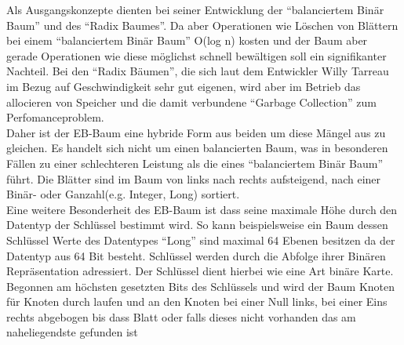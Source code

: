 \documentclass[a4paper,11pt,oneside,%
headsepline,												%
footsepline,												%
bibtotocnumbered									%
]{scrreprt}
\begin{document}
Als Ausgangskonzepte dienten bei seiner Entwicklung der \enquote{balanciertem Binär Baum} und des \enquote{Radix Baumes}. Da aber Operationen wie Löschen von Blättern bei einem \enquote{balanciertem Binär Baum} O(log n) kosten und der Baum aber gerade Operationen wie diese möglichst schnell bewältigen soll ein signifikanter Nachteil. Bei den \enquote{Radix Bäumen}, die sich laut dem Entwickler Willy Tarreau\autocite[Absatz Introduction]{Tarreau} im Bezug auf Geschwindigkeit sehr gut eigenen, wird aber im Betrieb das allocieren von Speicher und die damit verbundene \enquote{Garbage Collection} zum Perfomanceproblem.\\

Daher ist der \ac{EB-Baum} eine hybride Form aus beiden um diese Mängel aus zu gleichen. Es handelt sich nicht um einen balancierten Baum, was in besonderen Fällen zu einer schlechteren Leistung als die eines \enquote{balanciertem Binär Baum} führt. Die Blätter sind im Baum von links nach rechts aufsteigend, nach einer Binär- oder Ganzahl(e.g. Integer, Long) sortiert.\\

Eine weitere Besonderheit des \ac{EB-Baum} ist dass seine maximale Höhe durch den Datentyp der Schlüssel bestimmt wird.
So kann beispielsweise ein Baum dessen Schlüssel Werte des Datentypes \enquote{Long} sind maximal 64 Ebenen besitzen da der Datentyp aus 64 Bit besteht. Schlüssel werden durch die Abfolge ihrer Binären Repräsentation adressiert. Der Schlüssel dient hierbei wie eine Art binäre Karte. Begonnen am höchsten gesetzten Bits des Schlüssels und wird der Baum Knoten für Knoten durch laufen und an den Knoten bei einer Null links, bei einer Eins rechts abgebogen bis dass Blatt oder falls dieses nicht vorhanden das am naheliegendste gefunden ist
\end{document}
